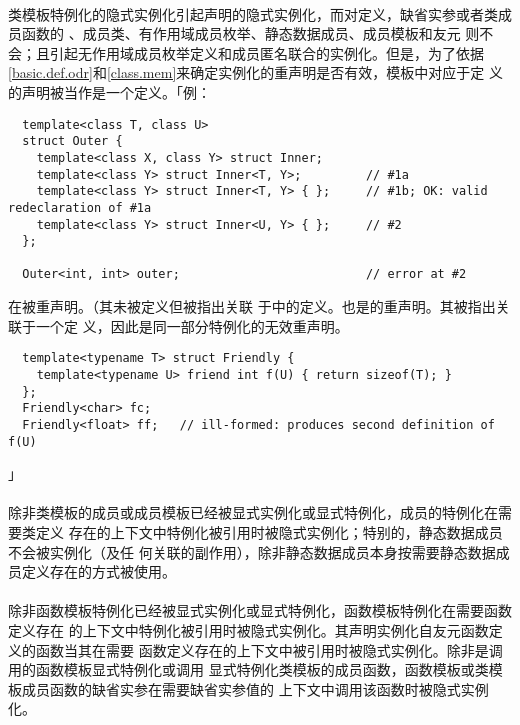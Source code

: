 \paragraph{}
类模板特例化的隐式实例化引起声明的隐式实例化，而对定义，缺省实参或者类成员函数的
、成员类、有作用域成员枚举、静态数据成员、成员模板和友元
则不会；且引起无作用域成员枚举定义和成员匿名联合的实例化。但是，为了依据
\ref{basic.def.odr}和\ref{class.mem}来确定实例化的重声明是否有效，模板中对应于定
义的声明被当作是一个定义。「例：
\begin{lstlisting}
  template<class T, class U>
  struct Outer {
    template<class X, class Y> struct Inner;
    template<class Y> struct Inner<T, Y>;         // #1a
    template<class Y> struct Inner<T, Y> { };     // #1b; OK: valid redeclaration of #1a
    template<class Y> struct Inner<U, Y> { };     // #2
  };

  Outer<int, int> outer;                          // error at #2
\end{lstlisting}
在被重声明。（其未被定义但被指出关联
于中的定义。也是的重声明。其被指出关联于一个定
义，因此是同一部分特例化的无效重声明。
\begin{lstlisting}
  template<typename T> struct Friendly {
    template<typename U> friend int f(U) { return sizeof(T); }
  };
  Friendly<char> fc;
  Friendly<float> ff;   // ill-formed: produces second definition of f(U)
\end{lstlisting}」

\paragraph{}
除非类模板的成员或成员模板已经被显式实例化或显式特例化，成员的特例化在需要类定义
存在的上下文中特例化被引用时被隐式实例化；特别的，静态数据成员不会被实例化（及任
何关联的副作用），除非静态数据成员本身按需要静态数据成员定义存在的方式被使用。

\paragraph{}
除非函数模板特例化已经被显式实例化或显式特例化，函数模板特例化在需要函数定义存在
的上下文中特例化被引用时被隐式实例化。其声明实例化自友元函数定义的函数当其在需要
函数定义存在的上下文中被引用时被隐式实例化。除非是调用的函数模板显式特例化或调用
显式特例化类模板的成员函数，函数模板或类模板成员函数的缺省实参在需要缺省实参值的
上下文中调用该函数时被隐式实例化。

